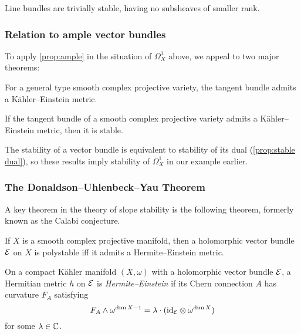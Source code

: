 \begin{remark}
    Line bundles are trivially stable, having no subsheaves of smaller rank.
\end{remark}

\subsubsection{Relation to ample vector bundles}

To apply \cref{prop:ample} in the situation of $\Omega^1_X$ above, we appeal to
two major theorems:

\begin{theorem}
    For a general type smooth complex projective variety, the tangent bundle
    admits a K\"ahler--Einstein metric.
\end{theorem}

\begin{theorem}
    If the tangent bundle of a smooth complex projective variety admits a
    K\"ahler--Einstein metric, then it is stable.
\end{theorem}

The stability of a vector bundle is equivalent to stability of its dual
(\cref{prop:stable dual}), so these results imply stability of $\Omega^1_X$ in
our example earlier.

\subsubsection{The Donaldson--Uhlenbeck--Yau Theorem}

A key theorem in the theory of slope stability is the following theorem,
formerly known as the Calabi conjecture.

\begin{theorem}
    If $X$ is a smooth complex projective manifold, then a holomorphic vector
    bundle $\mathcal{E}$ on $X$ is polystable iff it admits a Hermite--Einstein
    metric.
\end{theorem}

\begin{definition}
    On a compact K\"ahler manifold $(X,\omega)$ with a holomorphic vector bundle
    $\mathcal{E}$, a Hermitian metric $h$ on $\mathcal{E}$ is \emph{Hermite--Einstein} if
    its Chern connection $A$ has curvature $F_A$ satisfying
    \begin{equation*}
        F_A\wedge\omega^{\dim X-1}
            = \lambda\cdot(\mathrm{id}_{\mathcal{E}}\otimes\omega^{\dim X})
    \end{equation*}
    for some $\lambda\in\mathbb{C}$.
\end{definition}

